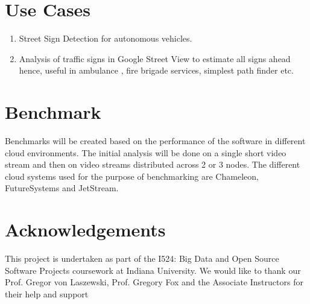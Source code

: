 \documentclass[9pt,twocolumn,twoside]{styles/osajnl}
\begin{document}
\section{Use Cases}
\begin{enumerate}
\item Street Sign Detection for autonomous vehicles.
\item Analysis of traffic signs in Google Street View to estimate all
  signs ahead hence, useful in ambulance , fire brigade services,
  simplest path finder etc.
\end{enumerate}

\section{Benchmark}
Benchmarks will be created based on the performance of the software in
different cloud environments. The initial analysis will be done on a
single short video stream and then on video streams distributed across
2 or 3 nodes. The different cloud systems used for the purpose of
benchmarking are Chameleon, FutureSystems and JetStream.



\section*{Acknowledgements}
This project is undertaken as part of the I524: Big Data and Open
Source Software Projects coursework at Indiana University. We would
like to thank our Prof. Gregor von Laszewski, Prof. Gregory Fox and
the Associate Instructors for their help and support


\end{document}
